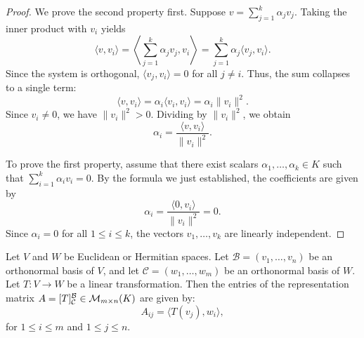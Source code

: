 \begin{proof}
    We prove the second property first. Suppose $v = \sum_{j=1}^k \alpha_j v_j$. Taking the inner product with $v_i$ yields
    \begin{equation*}
        \langle v, v_i \rangle = \left\langle \sum_{j=1}^k \alpha_j v_j, v_i \right\rangle = \sum_{j=1}^k \alpha_j \langle v_j, v_i \rangle.
    \end{equation*}
    Since the system is orthogonal, $\langle v_j, v_i \rangle = 0$ for all $j \neq i$. Thus, the sum collapses to a single term:
    \begin{equation*}
        \langle v, v_i \rangle = \alpha_i \langle v_i, v_i \rangle = \alpha_i \|v_i\|^2.
    \end{equation*}
    Since $v_i \neq 0$, we have $\|v_i\|^2 > 0$. Dividing by $\|v_i\|^2$, we obtain
    \begin{equation*}
        \alpha_i = \frac{\langle v, v_i \rangle}{\|v_i\|^2}.
    \end{equation*}
    
    To prove the first property, assume that there exist scalars $\alpha_1, \dots, \alpha_k \in K$ such that $\sum_{i=1}^k \alpha_i v_i = 0$. By the formula we just established, the coefficients are given by
    \begin{equation*}
        \alpha_i = \frac{\langle 0, v_i \rangle}{\|v_i\|^2} = 0.
    \end{equation*}
    Since $\alpha_i = 0$ for all $1 \leq i \leq k$, the vectors $v_1, \dots, v_k$ are linearly independent.
\end{proof}

\begin{proposition}
    Let $V$ and $W$ be Euclidean or Hermitian spaces. Let $\mathcal{B} = (v_1, \dots, v_n)$ be an orthonormal basis of $V$, and let $\mathcal{C} = (w_1, \dots, w_m)$ be an orthonormal basis of $W$. Let $T: V \to W$ be a linear transformation. Then the entries of the representation matrix $A = [T]_{\mathcal{C}}^{\mathcal{B}} \in \mathcal{M}_{m \times n}(K)$ are given by:
    \begin{equation*}
        A_{ij} = \langle T(v_j), w_i \rangle,
    \end{equation*}
    for $1 \leq i \leq m$ and $1 \leq j \leq n$.
\end{proposition}

